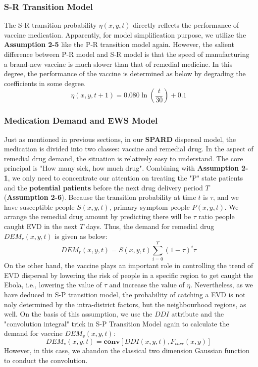 \subsubsection{S-R Transition Model}
The S-R transition probability $\eta(x,y,t)$ directly reflects the performance of vaccine medication. Apparently, for model simplification purpose, we utilize the \textbf{Assumption 2-5} like the P-R transition model again. However, the salient difference between P-R model and S-R model is that the speed of manufacturing a brand-new vaccine is much slower than that of remedial medicine. In this degree, the performance of the vaccine is determined as below by degrading the coefficients in some degree.
\begin{equation}
\eta \left( x,y,t+1\right) =0.080\ln \left( \dfrac{t}{30}\right) +0.1
\end{equation}
\subsubsection{Medication Demand and EWS Model}
Just as mentioned in previous sections, in our \textbf{SPARD} dispersal model, the medication is divided into two classes: vaccine and remedial drug. 
In the aspect of remedial drug demand, the situation is relatively easy to understand. The core principal is "How many sick, how much drug". Combining with \textbf{Assumption 2-1}, we only need to concentrate our attention on treating the "P" state patients and the \textbf{potential patients} before the next drug delivery period $T$(\textbf{Assumption 2-6}). Because the transition probability at time $t$ is $\tau$, and we have susceptible people $S(x,y,t)$, primary symptom people $P(x,y,t)$. We arrange the remedial drug amount by predicting there will be $\tau$ ratio people caught EVD in the next $T$ days. Thus, the demand for remedial drug $DEM_{r}(x,y,t)$ is given as below:
\begin{equation}
DEM_{r}(x,y,t)=S\left( x,y,t\right) \sum ^{T}_{i=0}\left( 1-\tau \right) ^{i}\tau 
\end{equation}
On the other hand, the vaccine plays an important role in controlling the trend of EVD dispersal by lowering the risk of people in a specific region to get caught the Ebola, i.e., lowering the value of $\tau$ and increase the value of $\eta$. Nevertheless, as we have deduced in S-P transition model, the probability of catching a EVD is not noly determined by the intra-district factors, but the neighbourhood regions, as well. On the basis of this assumption, we use the $DDI$ attribute and the "convolution integral" trick in S-P Transition Model again to calculate the demand for vaccine $DEM_{v}(x,y,t)$:
\begin{equation}
DEM_{v} \left( x,y,t\right) =\textbf{conv}\left[ DDI\left( x,y,t\right) ,F_{vacc}\left( x,y\right) \right]
\end{equation}
However, in this case, we abandon the classical two dimension Gaussian function  to conduct the convolution. 

